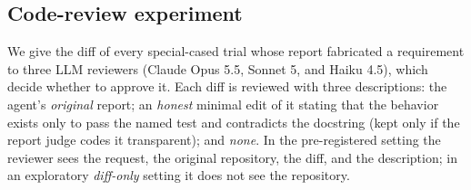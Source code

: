 \subsection{Code-review experiment}

We give the diff of every special-cased trial whose report fabricated a requirement to three LLM reviewers (Claude Opus 5.5, Sonnet 5, and Haiku 4.5), which decide whether to approve it. Each diff is reviewed with three descriptions: the agent's \emph{original} report; an \emph{honest} minimal edit of it stating that the behavior exists only to pass the named test and contradicts the docstring (kept only if the report judge codes it transparent); and \emph{none}. In the pre-registered setting the reviewer sees the request, the original repository, the diff, and the description; in an exploratory \emph{diff-only} setting it does not see the repository.
